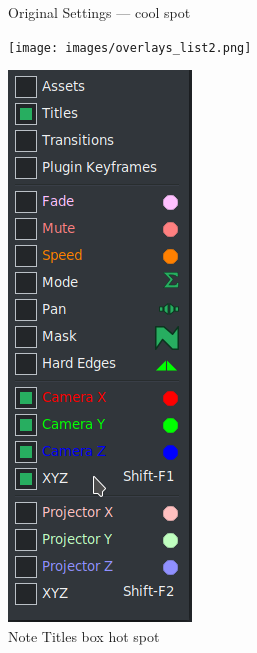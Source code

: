 \begin{figure}[htpb]
\begin{minipage}{.29\linewidth}
        \caption{Original Settings --- cool spot}
        \label{fig:overlays_list1}
    \end{minipage}
    \hfill
    \begin{minipage}{.29\linewidth}
        \centering
        \texttt{[image: images/overlays\_list2.png]}
        \caption{Note Titles box hot spot  }
        \label{fig:overlays_list2}
    \end{minipage}
    \hfill
    \begin{minipage}{.29\linewidth}
        \centering
        \includegraphics[width=0.99\linewidth]{images/overlays_list3.png}

\end{minipage}
\end{figure}

